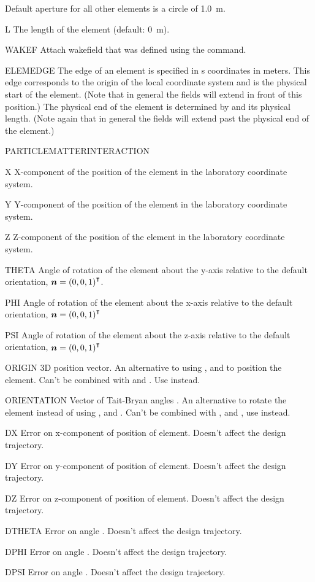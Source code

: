 \begin{kdescription}
  Default aperture for all other elements is a circle of \SI{1.0}{\meter}.

\item[L]
  The length of the element (default: \SI{0}{\meter}).
\item[WAKEF]
  Attach wakefield that was defined using the  command.
\item[ELEMEDGE]
    The edge of an element is specified in s coordinates in meters. This edge corresponds to the origin of the local coordinate system and is the physical start of the element. (Note that in general the fields will extend in front of this position.) The physical end of the element is determined by  and its physical length. (Note again that in general the fields will extend past the physical end of the element.)
\item[PARTICLEMATTERINTERACTION]
\item[X]
  X-component of the position of the element in the laboratory coordinate system.
\item[Y]
  Y-component of the position of the element in the laboratory coordinate system.
\item[Z]
  Z-component of the position of the element in the laboratory coordinate system.
\item[THETA]
  Angle of rotation of the element about the y-axis relative to the default orientation, ${\bm{n}} = \left(0, 0, 1\right)^\intercal$.
\item[PHI]
  Angle of rotation of the element about the x-axis relative to the default orientation, ${\bm{n}} = \left(0, 0, 1\right)^\intercal$ \item[PSI]
  Angle of rotation of the element about the z-axis relative to the default orientation, ${\bm{n}} = \left(0, 0, 1\right)^\intercal$ \item[ORIGIN]
  3D position vector. An alternative to using ,  and  to position the element. Can't be combined with  and . Use  instead.
\item[ORIENTATION]
  Vector of Tait-Bryan angles \cite{bib:tait-bryan}. An alternative to rotate the element instead of using ,  and . Can't be combined with ,  and , use  instead.
\item[DX]
  Error on x-component of position of element. Doesn't affect the design trajectory.
\item[DY]
  Error on y-component of position of element. Doesn't affect the design trajectory.
\item[DZ]
  Error on z-component of position of element. Doesn't affect the design trajectory.
\item[DTHETA]
  Error on angle . Doesn't affect the design trajectory.
\item[DPHI]
  Error on angle . Doesn't affect the design trajectory.
\item[DPSI]
  Error on angle . Doesn't affect the design trajectory.


\end{kdescription}
